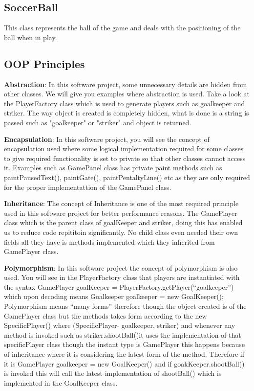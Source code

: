 \documentclass[12pt, dvipsnames, a4paper]{article}
\begin{document}
\subsection{SoccerBall}
This class represents the ball of the game and deals with the positioning of the ball when in play.

\clearpage

\subsection{OOP Principles}
\textbf{Abstraction}: In this software project, some unnecessary details are hidden from other classes. We will give you examples
where abstraction is used. Take a look at the PlayerFactory class which is used to generate players such as goalkeeper
and striker. The way object is created is completely hidden, what is done is a string is passed such as "goalkeeper" or
"striker" and object is returned.

\textbf{Encapsulation}: In this software project, you will see the concept of encapsulation used where some logical implementation
required for some classes to give required functionality is set to private so that other classes cannot access it.
Examples such as GamePanel class has private paint methods such as paintPausedText(), paintGate(), paintPentaltyLine() etc
as they are only required for the proper implementattion of the GamePanel class.

\textbf{Inheritance}: The concept of Inheritance is one of the most required principle used in this software project for better performance reasons.
The GamePlayer class which is the parent class of goalKeeper and striker, doing this has enabled us to reduce code repititoin significantly.
No child class even needed their own fields all they have is methods implemented which they inherited from GamePlayer class.

\textbf{Polymorphism}: In this software project the concept of polymorphism is also used. You will see in the PlayerFactory class that
players are instantiated with the syntax GamePlayer goalKeeper = PlayerFactory.getPlayer(“goalkeeper”) which upon decoding means Goalkeeper goalkeeper = new GoalKeeper();
Polymorphism means “many forms” therefore though the object created is of the GamePlayer class but the methods takes form according to the
new SpecificPlayer() where (SpecificPlayer- goalkeeper, striker) and whenever any method is invoked such as striker.shootBall()it uses the implementation
of that specificPlayer class though the instant type is GamePlayer this happens because of inheritance where it is considering the latest form of the method.
Therefore if it is GamePlayer goalkeeper =  new GoalKeeper() and if goakKeeper.shootBall() is invoked this will call the
latest implementation of shootBall() which is implemented in the GoalKeeper class.
\end{document}
